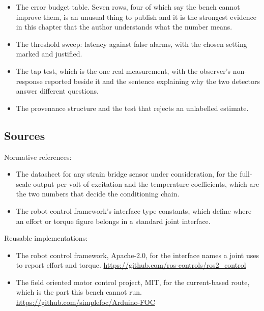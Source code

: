 \begin{itemize}
\item The error budget table. Seven rows, four of which say the bench cannot
improve them, is an unusual thing to publish and it is the strongest evidence in
this chapter that the author understands what the number means.
\item The threshold sweep: latency against false alarms, with the chosen setting
marked and justified.
\item The tap test, which is the one real measurement, with the observer's
non-response reported beside it and the sentence explaining why the two
detectors answer different questions.
\item The provenance structure and the test that rejects an unlabelled estimate.
\end{itemize}

\subsection*{Sources}

Normative references:
\begin{itemize}
\item The datasheet for any strain bridge sensor under consideration, for the
full-scale output per volt of excitation and the temperature coefficients, which
are the two numbers that decide the conditioning chain.
\item The robot control framework's interface type constants, which define where
an effort or torque figure belongs in a standard joint interface.
\end{itemize}

Reusable implementations:
\begin{itemize}
\item The robot control framework, Apache-2.0, for the interface names a joint
uses to report effort and torque.\newline
\url{https://github.com/ros-controls/ros2_control}
\item The field oriented motor control project, MIT, for the current-based
route, which is the part this bench cannot run.\newline
\url{https://github.com/simplefoc/Arduino-FOC}
\end{itemize}
